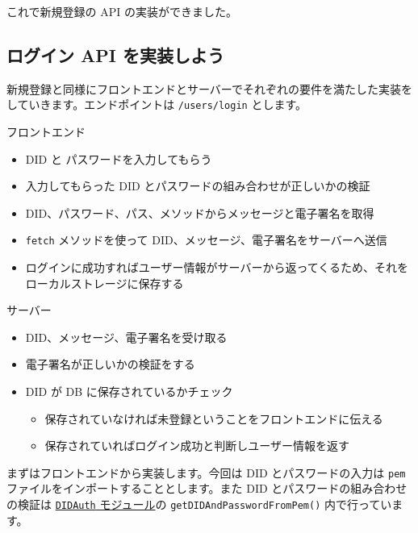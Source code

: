 これで新規登録の API の実装ができました。

\subsection{ログイン API
を実装しよう}\label{ux30edux30b0ux30a4ux30f3-api-ux3092ux5b9fux88c5ux3057ux3088ux3046}

新規登録と同様にフロントエンドとサーバーでそれぞれの要件を満たした実装をしていきます。エンドポイントは
\texttt{/users/login} とします。

フロントエンド

\begin{itemize}
\tightlist
\item
  DID と パスワードを入力してもらう
\item
  入力してもらった DID とパスワードの組み合わせが正しいかの検証
\item
  DID、パスワード、パス、メソッドからメッセージと電子署名を取得
\item
  \texttt{fetch} メソッドを使って
  DID、メッセージ、電子署名をサーバーへ送信
\item
  ログインに成功すればユーザー情報がサーバーから返ってくるため、それをローカルストレージに保存する
\end{itemize}

サーバー

\begin{itemize}
\tightlist
\item
  DID、メッセージ、電子署名を受け取る
\item
  電子署名が正しいかの検証をする
\item
  DID が DB に保存されているかチェック

  \begin{itemize}
  \tightlist
  \item
    保存されていなければ未登録ということをフロントエンドに伝える
  \item
    保存されていればログイン成功と判断しユーザー情報を返す
  \end{itemize}
\end{itemize}

まずはフロントエンドから実装します。今回は DID とパスワードの入力は
\texttt{pem} ファイルをインポートすることとします。また DID
とパスワードの組み合わせの検証は
\href{https://jigintern.github.io/did-login/auth/DIDAuth.js}{\texttt{DIDAuth}
モジュール}の \texttt{getDIDAndPasswordFromPem()} 内で行っています。

